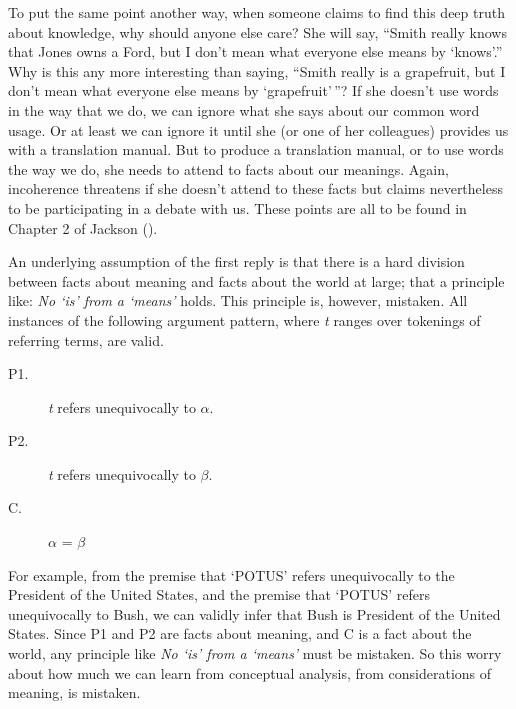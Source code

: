 \documentclass[
  11pt,
  letterpaper,
  DIV=11,
  numbers=noendperiod,
  oneside]{scrartcl}
\begin{document}
To put the same point another way, when someone claims to find this deep
truth about knowledge, why should anyone else care? She will say,
``Smith really knows that Jones owns a Ford, but I don't mean what
everyone else means by `knows'.'' Why is this any more interesting than
saying, ``Smith really is a grapefruit, but I don't mean what everyone
else means by `grapefruit'\,''? If she doesn't use words in the way that
we do, we can ignore what she says about our common word usage. Or at
least we can ignore it until she (or one of her colleagues) provides us
with a translation manual. But to produce a translation manual, or to
use words the way we do, she needs to attend to facts about our
meanings. Again, incoherence threatens if she doesn't attend to these
facts but claims nevertheless to be participating in a debate with us.
These points are all to be found in Chapter 2 of Jackson
().

An underlying assumption of the first reply is that there is a hard
division between facts about meaning and facts about the world at large;
that a principle like: \emph{No `is' from a `means'} holds. This
principle is, however, mistaken. All instances of the following argument
pattern, where \emph{t} ranges over tokenings of referring terms, are
valid.

\begin{description}
\item[P1.]
\emph{t} refers unequivocally to \({\alpha}\).
\item[P2.]
\emph{t} refers unequivocally to \({\beta}\).
\item[C.]
\({\alpha}\) = \({\beta}\)
\end{description}

For example, from the premise that `POTUS' refers unequivocally to the
President of the United States, and the premise that `POTUS' refers
unequivocally to Bush, we can validly infer that Bush is President of
the United States. Since P1 and P2 are facts about meaning, and C is a
fact about the world, any principle like \emph{No `is' from a `means'}
must be mistaken. So this worry about how much we can learn from
conceptual analysis, from considerations of meaning, is mistaken.
\end{document}
